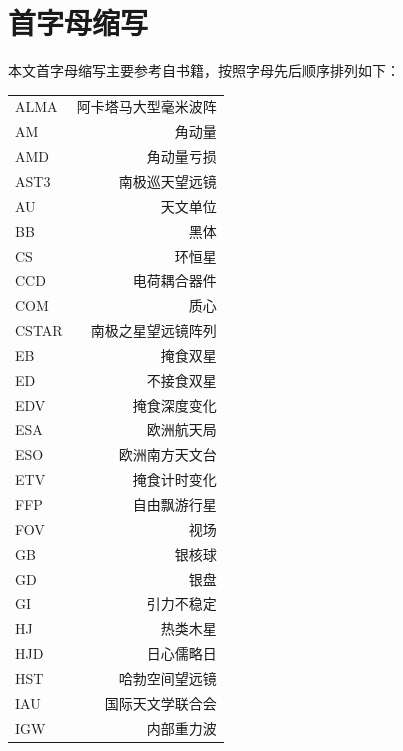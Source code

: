 \section{首字母缩写}  \label{apdx:acronym}
本文首字母缩写主要参考自书籍，按照字母先后顺序排列如下：
\begin{multicols}{2}
\begin{tabularx}{0.85\linewidth}{@{\extracolsep{\fill}}lr}
\centering
ALMA		&   阿卡塔马大型毫米波阵		\\ 
AM			&   角动量					\\ 
AMD			&   角动量亏损				\\ 
AST3		&   南极巡天望远镜			\\  
AU			&   天文单位				\\
BB			&   黑体					\\
CS 			&   环恒星					\\
CCD			&   电荷耦合器件			\\
COM			&   质心					\\
CSTAR		&   南极之星望远镜阵列		\\  
EB			&   掩食双星				\\ 
ED			&   不接食双星				\\ 
EDV			&   掩食深度变化			\\
ESA 			&   欧洲航天局				\\
ESO 		&   欧洲南方天文台			\\
ETV			&   掩食计时变化			\\
FFP			&   自由飘游行星			\\ 
FOV			&   视场					\\ 
GB			&   银核球					\\
GD			&   银盘					\\
GI			&   引力不稳定				\\
HJ			&   热类木星				\\
HJD			&   日心儒略日				\\
HST			&   哈勃空间望远镜			\\
IAU			&   国际天文学联合会		\\
IGW			&   内部重力波				\\

\end{tabularx}
\columnbreak


\end{multicols}
